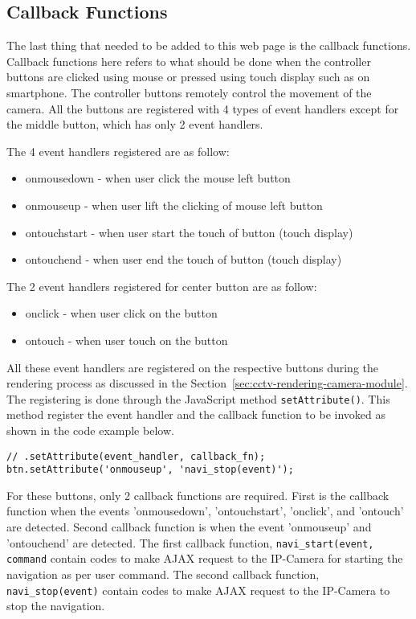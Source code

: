 \subsection{Callback Functions}
The last thing that needed to be added to this web page is the callback functions. Callback functions here refers to what should be done when the controller buttons are clicked using mouse or pressed using touch display such as on smartphone. The controller buttons remotely control the movement of the camera. All the buttons are registered with 4 types of event handlers except for the middle button, which has only 2 event handlers.

The 4 event handlers registered are as follow:
\begin{itemize}
\item onmousedown - when user click the mouse left button
\item onmouseup - when user lift the clicking of mouse left button
\item ontouchstart - when user start the touch of button (touch display)
\item ontouchend - when user end the touch of button (touch display)
\end{itemize}

The 2 event handlers registered for center button are as follow:
\begin{itemize}
\item onclick - when user click on the button
\item ontouch - when user touch on the button
\end{itemize}

All these event handlers are registered on the respective buttons during the rendering process as discussed in the Section~\ref{sec:cctv-rendering-camera-module}. The registering is done through the JavaScript method \texttt{setAttribute()}. This method register the event handler and the callback function to be invoked as shown in the code example below.

\begin{lstlisting}
// .setAttribute(event_handler, callback_fn);
btn.setAttribute('onmouseup', 'navi_stop(event)');
\end{lstlisting}

For these buttons, only 2 callback functions are required. First is the callback function when the events 'onmousedown', 'ontouchstart', 'onclick', and 'ontouch' are detected. Second callback function is when the event 'onmouseup' and 'ontouchend' are detected. The first callback function, \texttt{navi\_start(event, command} contain codes to make AJAX request to the IP-Camera for starting the navigation as per user command. The second callback function, \texttt{navi\_stop(event)} contain codes to make AJAX request to the IP-Camera to stop the navigation.

